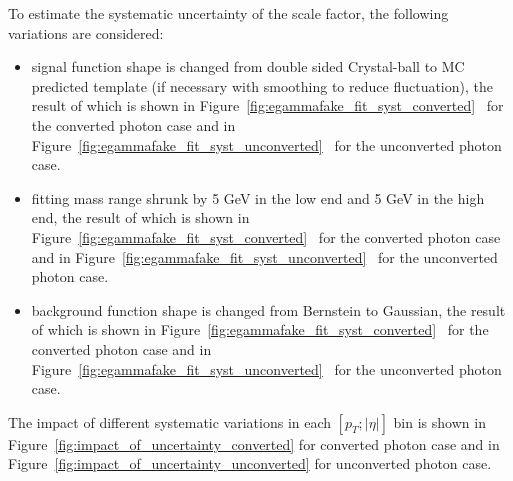 To estimate the systematic uncertainty of the scale factor, the following variations are considered: 
\begin{itemize}
\item signal function shape is changed from double sided Crystal-ball to MC predicted template (if necessary with smoothing to reduce fluctuation), the result of which is shown in Figure~\ref{fig:egammafake_fit_syst_converted}~ for the converted photon case and in Figure~\ref{fig:egammafake_fit_syst_unconverted}~ for the unconverted photon case. %
\item fitting mass range shrunk by 5 GeV in the low end and 5 GeV in the high end, the result of which is shown in Figure~\ref{fig:egammafake_fit_syst_converted}~ for the converted photon case and in Figure~\ref{fig:egammafake_fit_syst_unconverted}~ for the unconverted photon case. %
\item background function shape is changed from Bernstein to Gaussian, the result of which is shown in Figure~\ref{fig:egammafake_fit_syst_converted}~ for the converted photon case and in Figure~\ref{fig:egammafake_fit_syst_unconverted}~ for the unconverted photon case. %
\end{itemize}

The impact of different systematic variations in each $[p_{T};|\eta|]$ bin is shown in Figure~\ref{fig:impact_of_uncertainty_converted} for converted photon case and in Figure~\ref{fig:impact_of_uncertainty_unconverted} for unconverted photon case.

